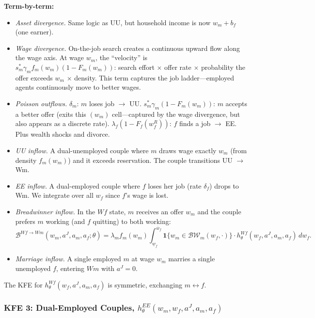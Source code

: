 \documentclass{article}
\begin{document}
\textbf{Term-by-term:}
\begin{itemize}
    \item[(i)] \textit{Asset divergence.} Same logic as UU, but household income is now $w_m + b_f$ (one earner).
    \item[(ii)] \textit{Wage divergence.} On-the-job search creates a continuous upward flow along the wage axis. At wage $w_m$, the ``velocity'' is $s_m^*\gamma_m f_m(w_m)(1-F_m(w_m))$: search effort $\times$ offer rate $\times$ probability the offer exceeds $w_m$ $\times$ density. This term captures the job ladder---employed agents continuously move to better wages.
    \item[(iii)] \textit{Poisson outflows.} $\delta_m$: $m$ loses job $\to$ UU. $s_m^*\gamma_m(1-F_m(w_m))$: $m$ accepts a better offer (exits this $(w_m)$ cell---captured by the wage divergence, but also appears as a discrete rate). $\lambda_f(1-F_f(w_f^R))$: $f$ finds a job $\to$ EE. Plus wealth shocks and divorce.
    \item[(v)] \textit{UU inflow.} A dual-unemployed couple where $m$ draws wage exactly $w_m$ (from density $f_m(w_m)$) and it exceeds reservation. The couple transitions UU $\to$ Wm.
    \item[(vi)] \textit{EE inflow.} A dual-employed couple where $f$ loses her job (rate $\delta_f$) drops to Wm. We integrate over all $w_f$ since $f$'s wage is lost.
    \item[(vii)] \textit{Breadwinner inflow.} In the $Wf$ state, $m$ receives an offer $w_m$ and the couple prefers $m$ working (and $f$ quitting) to both working:
    \[
        \mathcal{B}^{Wf\to Wm}(w_m, a^J, a_m, a_f;\theta) = \lambda_m f_m(w_m) \int_{\underline{w}_f}^{\overline{w}_f} \mathbf{1}\{w_m \in \mathcal{BW}_m(w_f,\cdot)\}\cdot h_\theta^{Wf}(w_f, a^J, a_m, a_f)\, dw_f.
    \]
    \item[(viii)] \textit{Marriage inflow.} A single employed $m$ at wage $w_m$ marries a single unemployed $f$, entering $Wm$ with $a^J = 0$.
\end{itemize}

The KFE for $h_\theta^{Wf}(w_f, a^J, a_m, a_f)$ is symmetric, exchanging $m\leftrightarrow f$.

\subsubsection*{KFE 3: Dual-Employed Couples, $h_\theta^{EE}(w_m, w_f, a^J, a_m, a_f)$}
\end{document}
